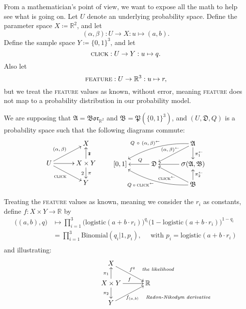 \documentclass[
twoside=true,
paper=letter,
fontsize=9pt,
pagesize=auto,
leqno,
openany,
headsepline,
overfullrule,
]{scrbook}
\theoremstyle{plain}
\theoremstyle{plain}
\theoremstyle{definition}
\theoremstyle{bfnoteitalic}
\theoremstyle{bfnoteroman}
\newcommand{\sigalg}[1]{\mathfrak{#1}}
\newcommand{\definedby}{\coloneqq}
\newcommand{\borel}{\mathfrak{Bor}}
\newcommand{\sagb}{\mathop{\hbox{\large{$\sigma$}}}\nolimits}
\newcommand{\preimage}[1]{\mathop{#1^{\leftarrow}}}
\newcommand{\R}{\mathbb{R}}
\newcommand{\productsig}[2]{\sagb(#1,#2)}
\newcommand{\powerset}{\mathfrak{P}}
\newcommand{\function}{f}
\newcommand{\measurespace}{X}
\newcommand{\measurespaceii}{Y}
\newcommand{\projectionone}{\pi_1}
\newcommand{\projectiontwo}{\pi_2}
\newcommand{\pspace}{\measurespace}%
\newcommand{\sspace}{\measurespaceii}%
\newcommand{\sspacesig}{\sigalg{B}}
\newcommand{\pspacesig}{\sigalg{A}}
\begin{document}
From a mathematician's point of view, we want to expose all the math to help see what is going on.
Let $U$ denote an underlying probability space.
Define the parameter space
$\pspace \definedby \R^2$,
and let
\[
(\alpha, \beta):
U\to\pspace:
u\mapsto (a,b).
\]
Define the sample space
$\sspace \definedby \{0,1\}^3 $,
and let
\[
\textsc{click}
:U\to\sspace
:u\mapsto q.
\]
Also let
\[
\textsc{feature}
:U\to\R^3
:u\mapsto r,
\]
but we treat the \textsc{feature} values as known, without error, meaning \textsc{feature} does not map to a probability distribution in our probability model.

We are supposing that
$\pspacesig = \borel_{\R^2}$ and
$\sspacesig=\powerset(\{0,1\}^3)$, and
$(U,\sigalg{D},Q)$ is a probability space such that the following diagrams commute:
\[
\xymatrix@R=16pt@C=30pt{
 & \pspace
 \\
 U \ar[ur]^{\makebox[0pt][r]{\scriptsize{$(\alpha, \beta)$}}}
 \ar[dr]_{\makebox[0pt][r]{\scriptsize{\textsc{click}}}}
 \ar[r] &
 \pspace\times\sspace \ar[u]_\projectionone \ar[d]^\projectiontwo
 \\
  & \sspace \\
}
%
\qquad
%
\xymatrix@R=16pt@C=30pt{
 & & \pspacesig
 \ar[dl]_{\kern45pt\makebox[0pt][r]{\scriptsize{$\preimage{(\alpha, \beta)}$}} }
 \ar[d]^{\preimage{\projectionone}}
 \ar@/_10pt/[lld]_{\kern25pt\makebox[0pt][r]{\scriptsize{$Q\,\circ\,\preimage{(\alpha,\beta)}$}}}
 \\
 [0,1] & \sigalg{D} \ar[l]_-{\ Q} &
 \productsig{\pspacesig}{\sspacesig}
 \ar[l]
 \\
 & & \sspacesig
  \ar[u]_{\preimage{\projectiontwo}}
  \ar[ul]^{\kern20pt\makebox[0pt][r]{\scriptsize{$\preimage{\textsc{click}}$}}}
  \ar@/^10pt/[llu]^{\makebox[0pt][r]{\scriptsize{$Q\circ\preimage{\textsc{click}}$}}}
  \\
}
\]


Treating the \textsc{feature} values as known, meaning we consider the $r_i$ as constants,
define $\function:\pspace\times\sspace \to \R$ by
\begin{align*}
\bigl((a,b),q\bigr)
& \mapsto
\prod_{i=1}^{3}
\bigl( \text{logistic}(a + b\cdot r_i) \bigr)^{q_i}
\bigl( 1 - \text{logistic}(a + b\cdot r_i) \bigr)^{1-q_i} \\
& = \prod_{i=1}^{3}
\text{Binomial}(q_i \vert 1, p_i),\quad
\text{ with $p_i = \text{logistic}(a  + b\cdot r_i )$} \\
\end{align*}
and illustrating:
\[
\xymatrix@R=16pt@C=30pt{
\pspace \ar[dr]^{\ \function^{q}\quad \rlap{\emph{\scriptsize the likelihood}}}
& \\
\pspace\times\sspace
\ar[u]^{\projectionone}
\ar[d]_{\projectiontwo}
\ar[r]^{\function}
& \R \\
\sspace
\ar[ur]_{\function_{(a,b)} \quad \rlap{\emph{\scriptsize Radon-Nikodym derivative}}}
&
}
\]
\end{document}
